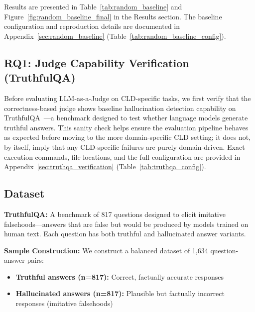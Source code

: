 Results are presented in Table~\ref{tab:random_baseline} and Figure~\ref{fig:random_baseline_final} in the Results section.
The baseline configuration and reproduction details are documented in Appendix~\ref{sec:random_baseline} (Table~\ref{tab:random_baseline_config}).


\subsection{RQ1: Judge Capability Verification (TruthfulQA)}

Before evaluating LLM-as-a-Judge on CLD-specific tasks, we first verify that the correctness-based judge shows baseline hallucination detection capability on TruthfulQA~\cite{lin2022truthfulqa}---a benchmark designed to test whether language models generate truthful answers. This sanity check helps ensure the evaluation pipeline behaves as expected before moving to the more domain-specific CLD setting; it does not, by itself, imply that any CLD-specific failures are purely domain-driven.
Exact execution commands, file locations, and the full configuration are provided in Appendix~\ref{sec:truthqa_verification} (Table~\ref{tab:truthqa_config}).

\subsection{Dataset}

\textbf{TruthfulQA:} A benchmark of 817 questions designed to elicit imitative falsehoods---answers that are false but would be produced by models trained on human text. Each question has both truthful and hallucinated answer variants.

\textbf{Sample Construction:} We construct a balanced dataset of 1,634 question-answer pairs:
\begin{itemize}[noitemsep]
    \item \textbf{Truthful answers (n=817):} Correct, factually accurate responses
    \item \textbf{Hallucinated answers (n=817):} Plausible but factually incorrect responses (imitative falsehoods)
\end{itemize}

